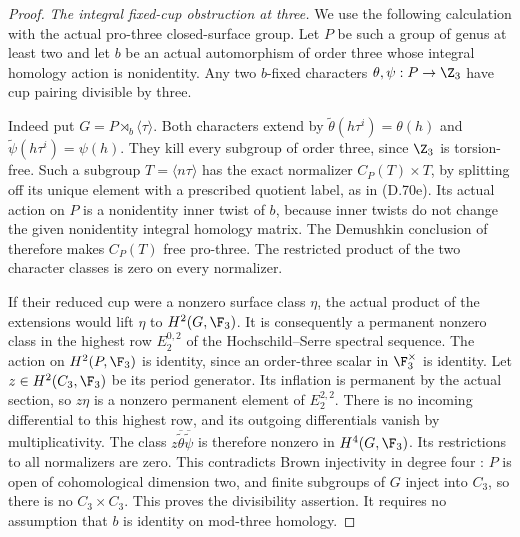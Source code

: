 \begin{proof}
\emph{The integral fixed-cup obstruction at three.}
We use the following calculation with the
actual pro-three closed-surface group.
Let $P$ be such a group of genus at least two
and let $b$ be an actual automorphism of
order three whose integral homology action
is nonidentity.
Any two $b$-fixed characters
$\theta,\psi:P\to\Z_3$ have cup pairing
divisible by three.

Indeed put $G=P\rtimes_b\langle\tau\rangle$.
Both characters extend by
$\widetilde\theta(h\tau^i)=\theta(h)$ and
$\widetilde\psi(h\tau^i)=\psi(h)$.
They kill every subgroup of order three,
since $\Z_3$ is torsion-free.
Such a subgroup $T=\langle n\tau\rangle$
has the exact normalizer
$C_P(T)\times T$, by splitting off its
unique element with a prescribed quotient
label, as in (D.70e).
Its actual action on $P$ is a nonidentity
inner twist of $b$, because inner twists
do not change the given nonidentity
integral homology matrix.
The Demushkin conclusion of
\cite[Corollary~2 and \S2]{A-KochloukovaZalesskii2007}
therefore makes $C_P(T)$ free pro-three.
The restricted product of the two character
classes is zero on every normalizer.

If their reduced cup were a nonzero surface
class $\eta$, the actual product of the
extensions would lift $\eta$ to $H^2(G,\F_3)$.
It is consequently a permanent nonzero
class in the highest row $E_2^{0,2}$
of the Hochschild--Serre spectral sequence.
The action on $H^2(P,\F_3)$ is identity,
since an order-three scalar in $\F_3^\times$
is identity.
Let $z\in H^2(C_3,\F_3)$ be its period
generator. Its inflation is permanent by
the actual section, so $z\eta$ is a
nonzero permanent element of $E_2^{2,2}$.
There is no incoming differential to
this highest row, and its outgoing
differentials vanish by multiplicativity.
The class
$z\overline{\widetilde\theta}
       \overline{\widetilde\psi}$ is therefore
nonzero in $H^4(G,\F_3)$.
Its restrictions to all normalizers are zero.
This contradicts Brown injectivity in
degree four
\cite[Theorem~2]{A-KochloukovaZalesskii2007}:
$P$ is open of cohomological dimension two,
and finite subgroups of $G$ inject into
$C_3$, so there is no $C_3\times C_3$.
This proves the divisibility assertion.
It requires no assumption that $b$ is
identity on mod-three homology.


\end{proof}
